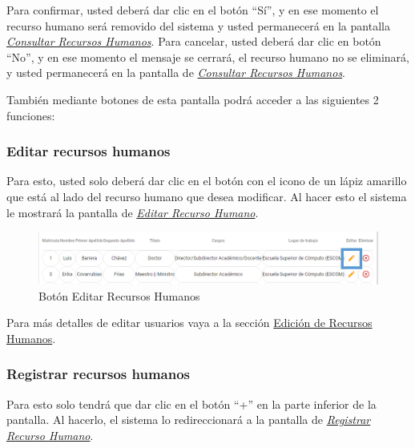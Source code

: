 \begin{enumerate}
\begin{figure}[H]
                \end{figure}

                Para confirmar, usted deberá dar clic en el botón “Sí”, y en ese momento el recurso humano será removido del sistema y usted permanecerá en la pantalla \hyperlink{consultarRH}{\textit{Consultar Recursos Humanos}}.
                Para cancelar, usted deberá dar clic en botón “No”, y en ese momento el mensaje se cerrará, el recurso humano no se eliminará, y usted permanecerá en la pantalla de \hyperlink{consultarRH}{\textit{Consultar Recursos Humanos}}.



        \end{enumerate}

        También mediante botones de esta pantalla podrá acceder a las siguientes 2 funciones:

        \subsubsection{Editar recursos humanos}

            Para esto, usted solo deberá dar clic en el botón con el icono de un lápiz amarillo que está al lado del recurso humano que desea modificar. Al hacer esto el sistema le mostrará la pantalla   de \hyperlink{editarRH}{\textit{Editar Recurso Humano}}.

            \begin{figure}[H]
                \centering
                \hypertarget{editarRH}{\includegraphics[width=0.7\linewidth]{images/SP1/BtnEditar}}
                \caption{Botón Editar Recursos Humanos}
                \label{editar}
            \end{figure}

            Para más detalles de editar usuarios vaya a la sección \hyperlink{editar-RH}{Edición de Recursos Humanos}.

        \subsubsection{Registrar recursos humanos}

            Para esto solo tendrá que dar clic en el botón “+” en la parte inferior de la pantalla. Al hacerlo, el sistema  lo redireccionará a la pantalla de \hyperlink{registrarRH}{\textit{Registrar Recurso Humano}}.

